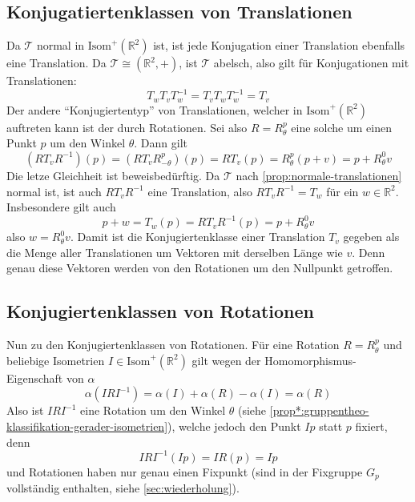 \documentclass[a4paper, ngerman]{article}
\numberwithin{equation}{chapter}
\theoremstyle{plain}
\theoremstyle{definition}
\newcommand{\geradisometr}{\ensuremath{\mathrm{Isom}^+(\mathbb R^2)}}
\newcommand{\anm}[1]{{\color{red} #1}}
\begin{document}
\subsection{Konjugatiertenklassen von Translationen}\label{subsec:konjugiertenklassen-von-translationen}
Da \(\mathcal T\) normal in \(\geradisometr\) ist, ist jede Konjugation einer Translation ebenfalls eine Translation. Da \(\mathcal T \cong (\mathbb R^2, +)\), ist \(\mathcal T\) abelsch, also gilt für Konjugationen mit Translationen: 
\begin{equation*}
    T_w T_v T_w^{-1} = T_v T_w T_w^{-1} = T_v
\end{equation*}
Der andere "`Konjugiertentyp"' von Translationen, welcher in \(\geradisometr\) auftreten kann ist der durch Rotationen. Sei also \(R = R_\theta^p\) eine solche um einen Punkt \(p\) um den Winkel \(\theta\). Dann gilt 
\begin{equation*}
    (RT_vR^{-1})(p) = (RT_vR_{-\theta}^p)(p) = RT_v(p) = R_\theta^p (p+v) = p + R_\theta^0 v
\end{equation*}
\anm{Die letze Gleichheit ist beweisbedürftig.} Da \(\mathcal T\) nach \cref{prop:normale-translationen} normal ist, ist auch \(RT_vR^{-1}\) eine Translation, also \(RT_vR^{-1} = T_w\) für ein \(w \in \mathbb R^2\). Insbesondere gilt auch 
\begin{equation*}
    p + w = T_w(p) = RT_vR^{-1}(p) = p + R_\theta^0 v
\end{equation*}
also \(w = R_\theta^0 v\). Damit ist die Konjugiertenklasse einer Translation \(T_v\) gegeben als die Menge aller Translationen um Vektoren mit derselben Länge wie \(v\). Denn genau diese Vektoren werden von den Rotationen um den Nullpunkt getroffen. 

\subsection{Konjugiertenklassen von Rotationen}\label{subsec:konjugiertenklassen-von-rotationen}
Nun zu den Konjugiertenklassen von Rotationen. Für eine Rotation \(R = R_\theta^p\) und beliebige Isometrien \(I \in \geradisometr\) gilt wegen der Homomorphismus-Eigenschaft von \(\alpha\) 
\begin{equation*}
    \alpha(IRI^{-1}) = \alpha(I) + \alpha(R) - \alpha(I) = \alpha(R)
\end{equation*}
Also ist \(IRI^{-1}\) eine Rotation um den Winkel \(\theta\) (siehe \cref{prop*:gruppentheo-klassifikation-gerader-isometrien}), welche jedoch den Punkt \(Ip\) statt \(p\) fixiert, denn
\begin{equation*}
    IRI^{-1}(Ip) = IR(p) = Ip
\end{equation*}
und Rotationen haben nur genau einen Fixpunkt (sind in der Fixgruppe \(G_p\) vollständig enthalten, siehe \cref{sec:wiederholung}). 
\end{document}
